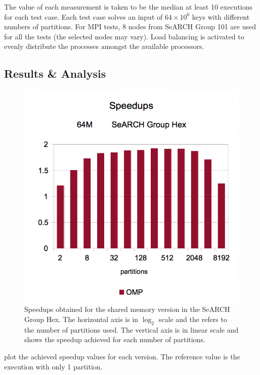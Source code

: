 \documentclass[abstract=on,9pt,twocolumn]{scrartcl}
\begin{document}
The value of each measurement is taken to be the median at least 10 executions for each test case. Each test case solves an input of $64\times 10^{6}$ keys with different numbers of partitions. For MPI tests, 8 nodes from SeARCH Group 101 are used for all the tests (the selected nodes may vary). Load balancing is activated to evenly distribute the processes amongst the available processors.

\subsection{Results \& Analysis}
\begin{figure}[b]
	\begin{center}
		\includegraphics[width=\columnwidth]{images/hex-speedups-omp.png}
	\end{center}
	\caption{Speedups obtained for the shared memory version in the SeARCH Group Hex. The horizontal axis is in $\log_{2}$ scale and the refers to the number of partitions used. The vertical axis is in linear scale and shows the speedup achieved for each number of partitions.}
	\label{fig:omp}
\end{figure}

 plot the achieved speedup values for each version. The reference value is the execution with only 1 partition.
\end{document}
